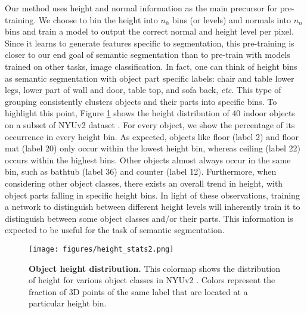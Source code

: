 Our method uses height and normal information as the main precursor for pre-training. We choose to bin the height into $n_h$ bins (or levels) and normals into $n_n$ bins and train a model to output the correct normal and height level per pixel. Since it learns to generate features specific to segmentation, this pre-training is closer to our end goal of semantic segmentation than to pre-train with models trained on other tasks, \eg image classification. In fact, one can think of height bins as semantic segmentation with object part specific labels: chair and table lower legs, lower part of wall and door, table top, and sofa back, \textit{etc}. This type of grouping consistently clusters objects and their parts into specific bins. To highlight this point, Figure \ref{fig:height_stats} shows the height distribution of 40 indoor objects on a subset of NYUv2 dataset \cite{Silberman2012}. For every object, we show the percentage of its occurrence in every height bin. As expected, objects like floor (label 2) and floor mat (label 20) only occur within the lowest height bin, whereas ceiling (label 22) occurs within the highest bins. Other objects almost always occur in the same bin, such as bathtub (label 36) and counter (label 12). Furthermore, when considering other object classes, there exists an overall trend in height, with object parts falling in specific height bins. In light of these observations, training a network to distinguish between different height levels will inherently train it to distinguish between some object classes and/or their parts. This information is expected to be useful for the task of semantic segmentation.



\begin{figure}[!h]
\begin{center}
\texttt{[image: figures/height\_stats2.png]}
\end{center}
\vspace{-5pt}
   \caption{\textbf{Object height distribution.} This colormap shows the distribution of height for various object classes in NYUv2 \cite{Silberman2012}. Colors represent the fraction of 3D points of the same label that are located at a particular height bin.} 
\label{fig:height_stats}
\end{figure}


